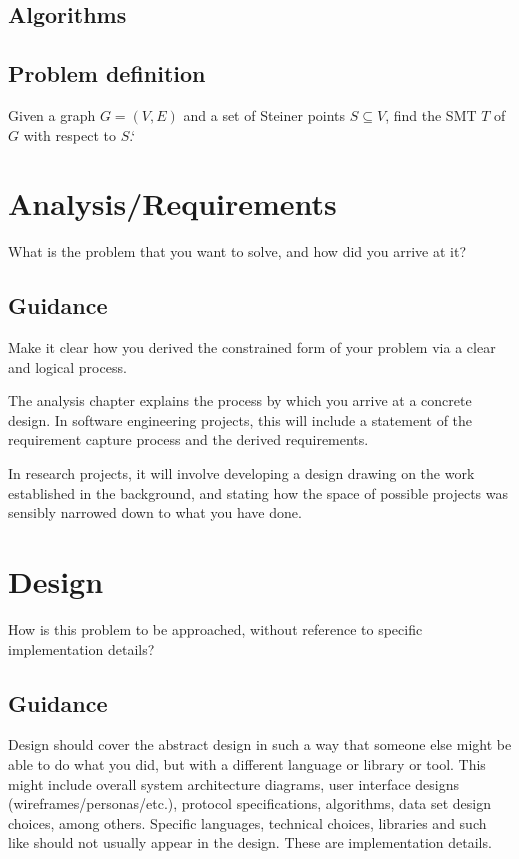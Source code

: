 \documentclass{l4proj}
\begin{document}
\section{Algorithms}

\section{Problem definition}

Given a graph $G = (V, E)$ and a set of Steiner points $S \subseteq V$, find the SMT $T$ of $G$ with respect to $S$.`


\chapter{Analysis/Requirements}
What is the problem that you want to solve, and how did you arrive at it?
\section{Guidance}
Make it clear how you derived the constrained form of your problem via a clear and logical process.

The analysis chapter explains the process by which you arrive at a concrete design. In software
engineering projects, this will include a statement of the requirement capture process and the
derived requirements.

In research projects, it will involve developing a design drawing on
the work established in the background, and stating how the space of possible projects was
sensibly narrowed down to what you have done.

\chapter{Design}
How is this problem to be approached, without reference to specific implementation details?
\section{Guidance}
Design should cover the abstract design in such a way that someone else might be able to do what you did,
but with a different language or library or tool. This might include overall system architecture diagrams,
user interface designs (wireframes/personas/etc.), protocol specifications, algorithms, data set design choices,
among others. Specific languages, technical choices, libraries and such like should not usually appear in the design. These are implementation details.
\end{document}
